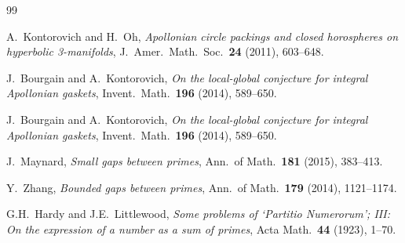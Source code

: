 \documentclass[12pt,a4paper]{article}
\theoremstyle{remark}
\begin{document}
\begin{thebibliography}{99}

A.~Kontorovich and H.~Oh,
\emph{Apollonian circle packings and closed horospheres on hyperbolic
3-manifolds},
J.~Amer.\ Math.\ Soc.\ \textbf{24} (2011), 603--648.

J.~Bourgain and A.~Kontorovich,
\emph{On the local-global conjecture for integral Apollonian gaskets},
Invent.\ Math.\ \textbf{196} (2014), 589--650.

J.~Bourgain and A.~Kontorovich,
\emph{On the local-global conjecture for integral Apollonian gaskets},
Invent.\ Math.\ \textbf{196} (2014), 589--650.

J.~Maynard,
\emph{Small gaps between primes},
Ann.\ of Math.\ \textbf{181} (2015), 383--413.

Y.~Zhang,
\emph{Bounded gaps between primes},
Ann.\ of Math.\ \textbf{179} (2014), 1121--1174.

G.H.~Hardy and J.E.~Littlewood,
\emph{Some problems of `Partitio Numerorum'; III: On the expression of
a number as a sum of primes},
Acta Math.\ \textbf{44} (1923), 1--70.

\end{thebibliography}
\end{document}
